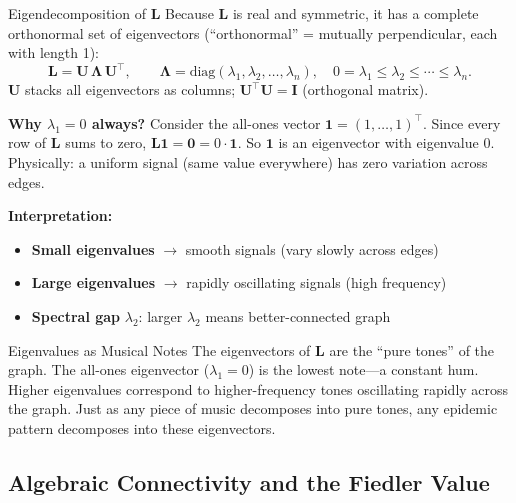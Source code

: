 \begin{mathbox}{Eigendecomposition of $\mathbf{L}$}
Because $\mathbf{L}$ is real and symmetric, it has a complete orthonormal set of eigenvectors (``orthonormal'' = mutually perpendicular, each with length 1):
\[
\mathbf{L} = \mathbf{U}\,\boldsymbol{\Lambda}\,\mathbf{U}^\top, \qquad
\boldsymbol{\Lambda} = \mathrm{diag}(\lambda_1, \lambda_2, \dots, \lambda_n), \quad
0 = \lambda_1 \leq \lambda_2 \leq \cdots \leq \lambda_n.
\]
$\mathbf{U}$ stacks all eigenvectors as columns; $\mathbf{U}^\top\mathbf{U} = \mathbf{I}$ (orthogonal matrix).

\textbf{Why $\lambda_1 = 0$ always?} Consider the all-ones vector $\mathbf{1} = (1,\ldots,1)^\top$. Since every row of $\mathbf{L}$ sums to zero, $\mathbf{L}\mathbf{1} = \mathbf{0} = 0 \cdot \mathbf{1}$. So $\mathbf{1}$ is an eigenvector with eigenvalue 0. Physically: a uniform signal (same value everywhere) has zero variation across edges.

\textbf{Interpretation:}
\begin{itemize}[noitemsep]
    \item \textbf{Small eigenvalues} $\to$ smooth signals (vary slowly across edges)
    \item \textbf{Large eigenvalues} $\to$ rapidly oscillating signals (high frequency)
    \item \textbf{Spectral gap} $\lambda_2$: larger $\lambda_2$ means better-connected graph
\end{itemize}
\end{mathbox}

\begin{analogybox}{Eigenvalues as Musical Notes}
The eigenvectors of $\mathbf{L}$ are the ``pure tones'' of the graph. The all-ones eigenvector ($\lambda_1 = 0$) is the lowest note---a constant hum. Higher eigenvalues correspond to higher-frequency tones oscillating rapidly across the graph. Just as any piece of music decomposes into pure tones, any epidemic pattern decomposes into these eigenvectors.
\end{analogybox}

\subsection{Algebraic Connectivity and the Fiedler Value}

